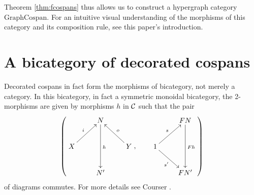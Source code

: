 Theorem \ref{thm:fcospans} thus allows us to construct a hypergraph category
$\mathrm{GraphCospan}$.  For an intuitive visual understanding of the morphisms
of this category and its composition rule, see this paper's introduction.



\section{A bicategory of decorated cospans}
Decorated cospans in fact form the morphisms of bicategory, not merely a
category. In this bicategory, in fact a symmetric monoidal bicategory, the
2-morphisms are given by morphisms $h$ in $\mathcal C$ such that the pair 
  \[
    \left(
    \begin{aligned}
      \xymatrix{
	& N \ar[dd]^h \\  
	X \ar[ur]^{i} && Y \ar[ul]_{o} \\
	& N'
      }
    \end{aligned}
    ,
    \qquad
    \begin{aligned}
      \xymatrix{
	& FN \ar[dd]^{Fh} \\
	1 \ar[ur]^{s} \ar[dr]_{s'} \\
	& FN'
      }
    \end{aligned}
    \right)
  \]
  of diagrams commutes. For more details see Courser \cite{Cou16}.
